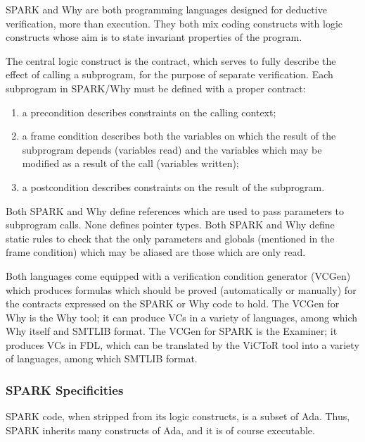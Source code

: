 \documentclass{article}
\begin{document}
SPARK and Why are both programming languages designed for deductive
verification, more than execution. They both mix coding constructs with logic
constructs whose aim is to state invariant properties of the program.

The central logic construct is the contract, which serves to fully describe the
effect of calling a subprogram, for the purpose of separate verification. Each
subprogram in SPARK/Why must be defined with a proper contract:
\begin{enumerate}
\item a precondition describes constraints on the calling context;
\item a frame condition describes both the variables on which the result of the
  subprogram depends (variables read) and the variables which may be modified
  as a result of the call (variables written);
\item a postcondition describes constraints on the result of the subprogram.
\end{enumerate}

Both SPARK and Why define references which are used to pass parameters to
subprogram calls. None defines pointer types. Both SPARK and Why define static
rules to check that the only parameters and globals (mentioned in the frame
condition) which may be aliased are those which are only read.

Both languages come equipped with a verification condition generator (VCGen)
which produces formulas which should be proved (automatically or manually) for
the contracts expressed on the SPARK or Why code to hold. The VCGen for Why is
the Why tool; it can produce VCs in a variety of languages, among which Why
itself and SMTLIB format.  The VCGen for SPARK is the Examiner; it produces VCs
in FDL, which can be translated by the ViCToR tool into a variety of languages,
among which SMTLIB format.

\subsubsection{SPARK Specificities}

SPARK code, when stripped from its logic constructs, is a subset of
Ada. Thus, SPARK inherits many constructs of Ada, and it is of course
executable.
\end{document}
